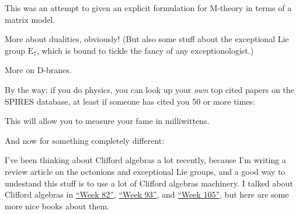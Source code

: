 \documentclass{article}
\def\tightlist{}
\renewcommand{\texttt}[1]{%
  \begingroup
  \ttfamily
  \begingroup\lccode`~=`/\lowercase{\endgroup\def~}{/\discretionary{}{}{}}%
  \begingroup\lccode`~=`[\lowercase{\endgroup\def~}{[\discretionary{}{}{}}%
  \begingroup\lccode`~=`.\lowercase{\endgroup\def~}{.\discretionary{}{}{}}%
  \catcode`/=\active\catcode`[=\active\catcode`.=\active
  \scantokens{#1\noexpand}%
  \endgroup
}
\begin{document}
This was an attempt to given an explicit formulation for M-theory in
terms of a matrix model.


More about dualities, obviously! (But also some stuff about the
exceptional Lie group \(\mathrm{E}_7\), which is bound to tickle the
fancy of any exceptionologist.)


More on D-branes.

By the way: if you do physics, you can look up your \emph{own} top cited
papers on the SPIRES database, at least if someone has cited you 50 or
more times:


This will allow you to measure your fame in milliwittens.

And now for something completely different:

I've been thinking about Clifford algebras a lot recently, because I'm
writing a review article on the octonions and exceptional Lie groups,
and a good way to undestand this stuff is to use a lot of Clifford
algebras machinery. I talked about Clifford algebras in
\protect\hyperlink{week82}{``Week 82''},
\protect\hyperlink{week93}{``Week 93''}, and
\protect\hyperlink{week105}{``Week 105''}, but here are some more nice
books about them.
\end{document}
